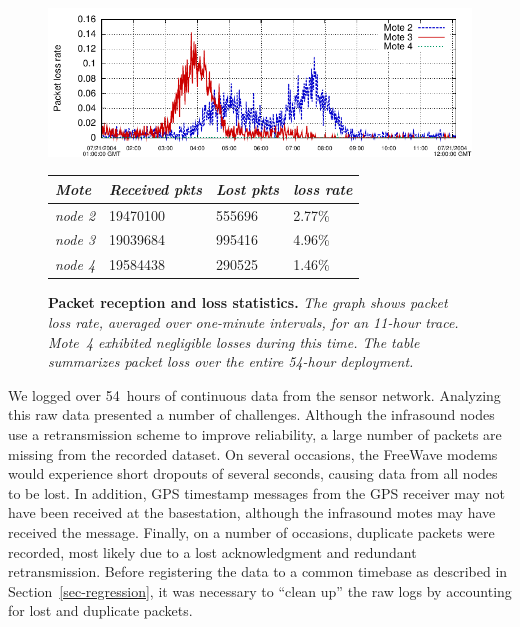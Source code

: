 \begin{figure}[t]
\begin{center}
\includegraphics[width=1.0\hsize]{./figures/loss/lossrate.pdf} \\
\vspace{0.1in}
\begin{small}
\begin{tabular}{|llll|} \hline
{\em Mote} & {\em Received pkts} & {\em Lost pkts} & {\em loss rate} \\ \hline
{\em node 2} & 19470100 & 555696 & 2.77\% \\
{\em node 3} & 19039684 & 995416 & 4.96\% \\
{\em node 4} & 19584438 & 290525 & 1.46\% \\ \hline
\end{tabular}
\end{small}
\end{center}
\caption{\small {\bf Packet reception and loss statistics.}
{\em The graph shows packet loss rate, averaged over one-minute intervals,
for an 11-hour trace. Mote~4 exhibited negligible losses during this
time. The table summarizes packet loss over the
entire 54-hour deployment.}}
\label{fig-lossrate}
\end{figure}

We logged over 54~hours of continuous data from the sensor
network. Analyzing this raw data presented a number of challenges.
Although the infrasound nodes use a retransmission scheme to improve
reliability, a large number of packets are missing from the recorded
dataset. On several occasions, the FreeWave modems would experience
short dropouts of several seconds, causing data from all nodes to be
lost. In addition, GPS timestamp messages from the GPS receiver may not
have been received at the basestation, although the infrasound motes may
have received the message. Finally, on a number of occasions,
duplicate packets were recorded, most likely due to a lost acknowledgment
and redundant retransmission.  
Before registering the data to a common
timebase as described in Section~\ref{sec-regression}, it was necessary to
``clean up'' the raw logs by accounting for lost and duplicate packets.

